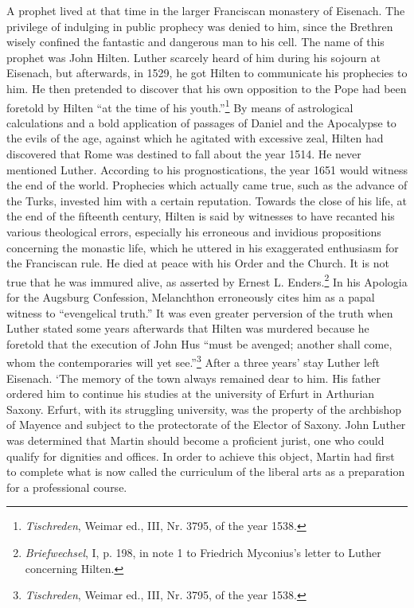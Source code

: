 A prophet lived at that time in the larger Franciscan monastery of
Eisenach. The privilege of indulging in public prophecy was denied
to him, since the Brethren wisely confined the fantastic and dangerous
man to his cell. The name of this prophet was John Hilten. Luther
scarcely heard of him during his sojourn at Eisenach, but afterwards,
in 1529, he got Hilten to communicate his prophecies to him. He
then pretended to discover that his own opposition to the Pope had
been foretold by Hilten “at the time of his youth.”\footnote{\textit{Tischreden}, Weimar ed., III, Nr. 3795, of the year 1538.}
By means of
astrological calculations and a bold application of passages of Daniel
and the Apocalypse to the evils of the age, against which he agitated
with excessive zeal, Hilten had discovered that Rome was destined to
fall about the year 1514. He never mentioned Luther. According to
his prognostications, the year 1651 would witness the end of the
world. Prophecies which actually came true, such as the advance of
the Turks, invested him with a certain reputation. Towards the close
of his life, at the end of the fifteenth century, Hilten is said by witnesses to have recanted his various theological errors, especially his
erroneous and invidious propositions concerning the monastic life,
which he uttered in his exaggerated enthusiasm for the Franciscan
rule. He died at peace with his Order and the Church. It is not true
that he was immured alive, as asserted by Ernest L. Enders.\footnote{\textit{Briefwechsel}, I, p. 198, in note 1 to Friedrich Myconius’s letter to Luther concerning Hilten.}
In his
Apologia for the Augsburg Confession, Melanchthon erroneously
cites him as a papal witness to “evengelical truth.” It was even greater
perversion of the truth when Luther stated some years afterwards
that Hilten was murdered because he foretold that the execution of
John Hus “must be avenged; another shall come, whom the contemporaries will yet see.”\footnote{\textit{Tischreden}, Weimar ed., III, Nr. 3795, of the year 1538.}
After a three years’ stay Luther left Eisenach. ‘The memory of the
town always remained dear to him. His father ordered him to continue his studies at the university of Erfurt in Arthurian Saxony.
Erfurt, with its struggling university, was the property of the archbishop
of Mayence and subject to the protectorate of the Elector of
Saxony. John Luther was determined that Martin should become a
proficient jurist, one who could qualify for dignities and offices. In
order to achieve this object, Martin had first to complete what is now
called the curriculum of the liberal arts as a preparation for a professional course.

